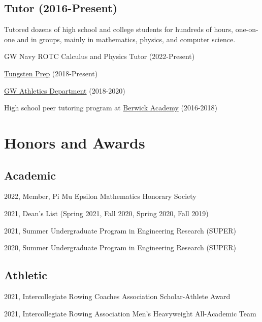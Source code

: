 \documentclass[letterpaper]{article}
\renewenvironment{itemize}{
  \begin{list}{}{
    \setlength{\leftmargin}{1.5em}
  }
}{
  \end{list}
}
\begin{document}
\subsection*{Tutor (2016-Present)}
Tutored dozens of high school and college students for hundreds of hours, one-on-one and in groups, mainly in mathematics, physics, and computer science. 
\begin{itemize}
\item 
GW Navy ROTC Calculus and Physics Tutor (2022-Present)
\item
\href{https://www.tungstenprep.com/}{Tungsten Prep} (2018-Present) 
\item
\href{https://gwsports.com/sports/2018/7/23/school-bio-academic-support-tutor-info-html.aspx}{GW Athletics Department} (2018-2020) 
\item 
High school peer tutoring program at \href{https://www.berwickacademy.org/}{Berwick Academy} (2016-2018)
\end{itemize}


\section*{Honors and Awards}

\subsection*{Academic}
\begin{itemize}
\item 2022, Member, Pi Mu Epsilon Mathematics Honorary Society
\item 2021, Dean's List (Spring 2021, Fall 2020, Spring 2020, Fall 2019)
\item 2021, Summer Undergraduate Program in Engineering Research (SUPER)
\item 2020, Summer Undergraduate Program in Engineering Research (SUPER)
\end{itemize}
\subsection*{Athletic}
\begin{itemize}
\item 2021, Intercollegiate Rowing Coaches Association Scholar-Athlete Award
\item 2021, Intercollegiate Rowing Association Men's Heavyweight All-Academic Team
\end{itemize}
\end{document}
